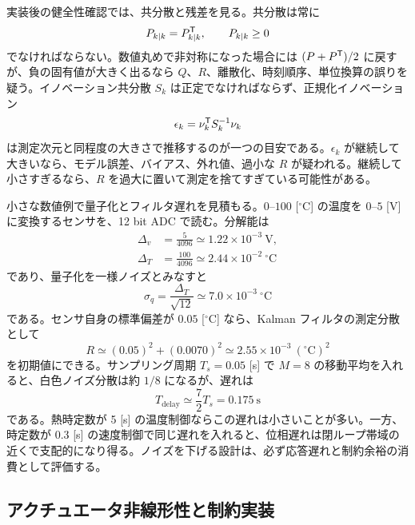 実装後の健全性確認では、共分散と残差を見る。共分散は常に
\begin{equation}
  P_{k|k}=P_{k|k}^{\mathsf{T}},
  \qquad
  P_{k|k}\ge0
\end{equation}
でなければならない。数値丸めで非対称になった場合には $(P+P^{\mathsf{T}})/2$ に戻すが、負の固有値が大きく出るなら $Q$、$R$、離散化、時刻順序、単位換算の誤りを疑う。イノベーション共分散 $S_k$ は正定でなければならず、正規化イノベーション
\begin{equation}
  \epsilon_k=\nu_k^{\mathsf{T}} S_k^{-1}\nu_k
\end{equation}
は測定次元と同程度の大きさで推移するのが一つの目安である。$\epsilon_k$ が継続して大きいなら、モデル誤差、バイアス、外れ値、過小な $R$ が疑われる。継続して小さすぎるなら、$R$ を過大に置いて測定を捨てすぎている可能性がある。

小さな数値例で量子化とフィルタ遅れを見積もる。$0$--$100$ [$^\circ$C] の温度を $0$--$5$ [V] に変換するセンサを、12 bit ADC で読む。分解能は
\begin{align}
  \Delta_v&=\frac{5}{4096}\simeq1.22\times10^{-3}\ \mathrm{V},\\
  \Delta_T&=\frac{100}{4096}\simeq2.44\times10^{-2}\ {^\circ\mathrm{C}}
\end{align}
であり、量子化を一様ノイズとみなすと
\begin{equation}
  \sigma_q=\frac{\Delta_T}{\sqrt{12}}
  \simeq7.0\times10^{-3}\ {^\circ\mathrm{C}}
\end{equation}
である。センサ自身の標準偏差が $0.05$ [$^\circ$C] なら、Kalman フィルタの測定分散として
\begin{equation}
  R\simeq(0.05)^2+(0.0070)^2
  \simeq2.55\times10^{-3}\ ({^\circ\mathrm{C}})^2
\end{equation}
を初期値にできる。サンプリング周期 $T_s=0.05$ [s] で $M=8$ の移動平均を入れると、白色ノイズ分散は約 $1/8$ になるが、遅れは
\begin{equation}
  T_{\mathrm{delay}}\simeq\frac{7}{2}T_s=0.175\ \mathrm{s}
\end{equation}
である。熱時定数が 5 [s] の温度制御ならこの遅れは小さいことが多い。一方、時定数が 0.3 [s] の速度制御で同じ遅れを入れると、位相遅れは閉ループ帯域の近くで支配的になり得る。ノイズを下げる設計は、必ず応答遅れと制約余裕の消費として評価する。

\subsection{アクチュエータ非線形性と制約実装}

